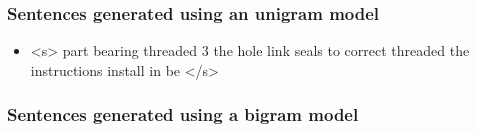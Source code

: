 \subsubsection{Sentences generated using an unigram model}\label{subsec:unigram-sentences}

\begin{itemize}
	\item <s> part bearing threaded 3 the hole link seals to correct threaded the instructions install in be </s>
\end{itemize}


\subsubsection{Sentences generated using a bigram model}\label{subsec:bigram-sentences}

